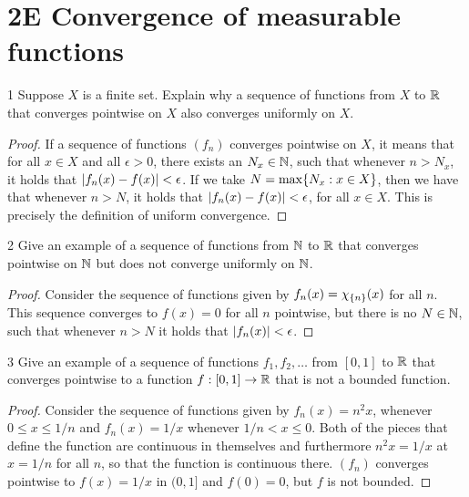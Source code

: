\section{2E Convergence of measurable functions}


\begin{exercise}{1}
Suppose $X$ is a finite set.
Explain why a sequence of functions from $X$ to $\mathbb{R}$ that converges pointwise on $X$ also converges uniformly on $X$.
\end{exercise}
\begin{proof}
If a sequence of functions $(f_n)$ converges pointwise on $X$, it means that for all $x\in X$ and all $\epsilon>0$, there exists an $N_x \in \mathbb{N}$, such that whenever $n > N_x$, it holds that $\left\lvert f_n(x) -f(x)\right\rvert < \epsilon$.
If we take $N = \max \{N_x: x \in X\}$, then we have that whenever $n>N$, it holds that $\left\lvert f_n(x) - f(x)\right\rvert < \epsilon$, for all $x \in X$.
This is precisely the definition of uniform convergence.
\end{proof} 

\begin{exercise}{2}
Give an example of a sequence of functions from $\mathbb{N}$ to $\mathbb{R}$ that converges pointwise on $\mathbb{N}$ but does not converge uniformly on $\mathbb{N}$.
\end{exercise}
\begin{proof}
Consider the sequence of functions given by $f_n(x) = \chi_{\{n\}}(x)$ for all $n$.
This sequence converges to $f(x) = 0$ for all $n$ pointwise, but there is no $N \in \mathbb{N}$, such that whenever $n>N$ it holds that $\left\lvert f_n(x)\right\rvert < \epsilon$.
\end{proof} 

\begin{exercise}{3}
Give an example of a sequence of functions $f_1, f_2, \dots$ from $[0,1]$ to $\mathbb{R}$ that converges pointwise to a function $f:[0,1] \to \mathbb{R}$ that is not a bounded function.
\end{exercise}
\begin{proof}
Consider the sequence of functions given by $f_n(x) = n^2 x$, whenever $0 \leq x \leq 1/n$ and $f_n(x) = 1/x$ whenever $1/n < x \leq 0$.
Both of the pieces that define the function are continuous in themselves and furthermore $n^2 x= 1/x$ at $x=1/n$ for all $n$, so that the function is continuous there. 
$(f_n)$ converges pointwise to $f(x) = 1/x$ in $(0,1]$ and $f(0) = 0$, but $f$ is not bounded.
\end{proof} 

